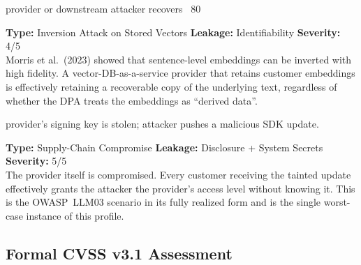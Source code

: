 \documentclass[12pt, a4paper]{report}
\begin{document}
\vspace{4pt}
\begin{attackbox}
  provider or downstream attacker recovers
        ~80%
\end{attackbox}
\begin{prosebox}
\small\textbf{Type:} Inversion Attack on Stored Vectors \quad
\textbf{Leakage:} Identifiability \quad \textbf{Severity:} 4/5\\[2pt]
Morris et al.\ (2023) showed that sentence-level embeddings can be inverted
with high fidelity. A vector-DB-as-a-service provider that retains
customer embeddings is effectively retaining a recoverable copy of the
underlying text, regardless of whether the DPA treats the embeddings as
``derived data''.
\end{prosebox}

\vspace{4pt}
\begin{attackbox}
  provider's signing key is stolen;
        attacker pushes a malicious SDK update.
\end{attackbox}
\begin{prosebox}
\small\textbf{Type:} Supply-Chain Compromise \quad
\textbf{Leakage:} Disclosure + System Secrets \quad \textbf{Severity:} 5/5\\[2pt]
The provider itself is compromised. Every customer receiving the tainted
update effectively grants the attacker the provider's access level
without knowing it. This is the OWASP~LLM03 scenario in its fully
realized form and is the single worst-case instance of this profile.
\end{prosebox}

\subsection{Formal CVSS v3.1 Assessment}
\end{document}
